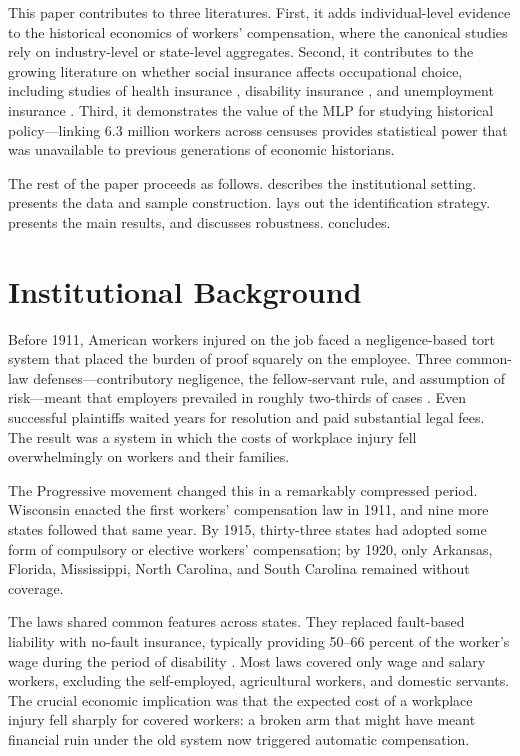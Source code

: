 \documentclass[12pt]{article}
\begin{document}
This paper contributes to three literatures. First, it adds individual-level evidence to the historical economics of workers' compensation, where the canonical studies \citep{fishback2000, fishback1998, gruber1994} rely on industry-level or state-level aggregates. Second, it contributes to the growing literature on whether social insurance affects occupational choice, including studies of health insurance \citep{bailey2015}, disability insurance \citep{autor2003}, and unemployment insurance \citep{nekoei2017}. Third, it demonstrates the value of the MLP for studying historical policy---linking 6.3 million workers across censuses provides statistical power that was unavailable to previous generations of economic historians.

The rest of the paper proceeds as follows.  describes the institutional setting.  presents the data and sample construction.  lays out the identification strategy.  presents the main results, and  discusses robustness.  concludes.


\section{Institutional Background}\label{sec:background}

Before 1911, American workers injured on the job faced a negligence-based tort system that placed the burden of proof squarely on the employee. Three common-law defenses---contributory negligence, the fellow-servant rule, and assumption of risk---meant that employers prevailed in roughly two-thirds of cases \citep{fishback2000}. Even successful plaintiffs waited years for resolution and paid substantial legal fees. The result was a system in which the costs of workplace injury fell overwhelmingly on workers and their families.

The Progressive movement changed this in a remarkably compressed period. Wisconsin enacted the first workers' compensation law in 1911, and nine more states followed that same year. By 1915, thirty-three states had adopted some form of compulsory or elective workers' compensation; by 1920, only Arkansas, Florida, Mississippi, North Carolina, and South Carolina remained without coverage.

The laws shared common features across states. They replaced fault-based liability with no-fault insurance, typically providing 50--66 percent of the worker's wage during the period of disability \citep{berkowitz1985}. Most laws covered only wage and salary workers, excluding the self-employed, agricultural workers, and domestic servants. The crucial economic implication was that the expected cost of a workplace injury fell sharply for covered workers: a broken arm that might have meant financial ruin under the old system now triggered automatic compensation.
\end{document}
